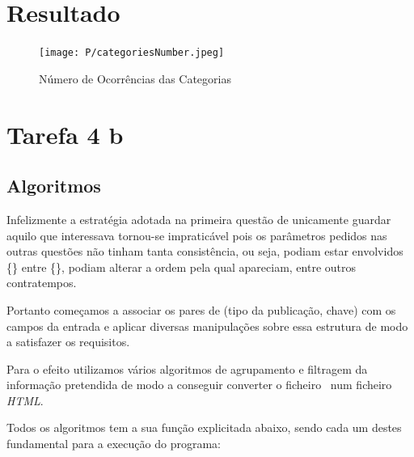 \documentclass[11pt,a4paper]{report}
\begin{document}
\section{Resultado}

\begin{figure}[h]
\centering
\texttt{[image: P/categoriesNumber.jpeg]}
\caption{Número de Ocorrências das Categorias}
\end{figure}
\newpage
\section{Tarefa 4 b}

\subsection{Algoritmos}

Infelizmente a estratégia adotada na primeira questão de unicamente guardar aquilo que interessava tornou-se impraticável pois os parâmetros pedidos nas outras questões não tinham tanta consistência, ou seja, podiam estar envolvidos \{\} entre \{\}, podiam alterar a ordem pela qual apareciam, entre outros contratempos.

Portanto começamos a associar os pares de (tipo da publicação, chave) com os campos da entrada e aplicar diversas manipulações sobre essa estrutura de modo a satisfazer os requisitos.

Para o efeito utilizamos vários algoritmos de agrupamento e filtragem da informação pretendida de modo a conseguir converter o ficheiro \bib\ num ficheiro \emph{HTML}.

Todos os algoritmos tem a sua função explicitada abaixo, sendo cada um destes fundamental para a execução do programa:
\end{document}
